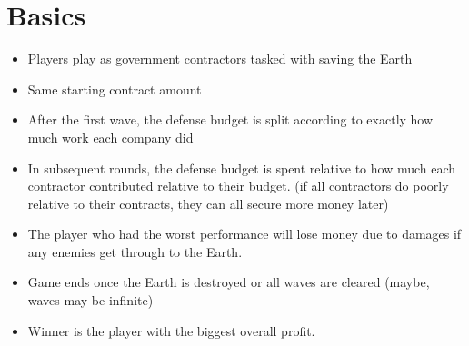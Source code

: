 \documentclass[12pt]{article}
\begin{document}
\maketitle

\section*{Basics}

\begin{itemize}
\item Players play as government contractors tasked with saving the Earth
\item Same starting contract amount
\item After the first wave, the defense budget is split according to exactly how
much work each company did
\item In subsequent rounds, the defense budget is spent relative to how much
each contractor contributed relative to their budget. (if all contractors do 
poorly relative to their contracts, they can all secure more money later)
\item The player who had the worst performance will lose money due to damages
if any enemies get through to the Earth.
\item Game ends once the Earth is destroyed or all waves are cleared (maybe,
waves may be infinite)
\item Winner is the player with the biggest overall profit.
\end{itemize}
\end{document}
